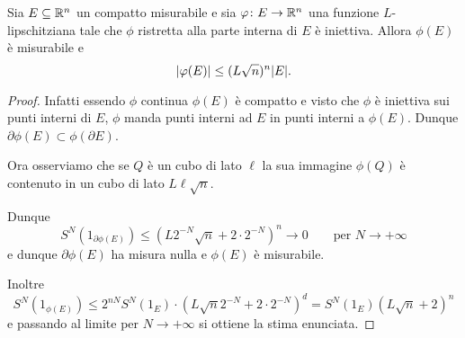 \begin{lemma}
Sia $E\subseteq {\mathbb R}^n$ un compatto misurabile e sia 
$\varphi\colon E\to {\mathbb R}^n$ una funzione $L$-lipschitziana
tale che $\phi$ ristretta alla parte interna di $E$ è iniettiva.
Allora $\phi(E)$ è misurabile e 
\[
  {\left|\varphi(E)\right|} \le (L\sqrt n)^n {\left|E\right|}. 
\]
\end{lemma}
\begin{proof}
Infatti essendo $\phi$ continua $\phi(E)$ è compatto e 
visto che $\phi$ è iniettiva sui punti interni di $E$, 
$\phi$ manda punti interni ad $E$ in punti interni a $\phi(E)$.
Dunque $\partial \phi(E) \subset \phi(\partial E)$.

Ora osserviamo che se $Q$ è un cubo di lato $\ell$ la sua immagine $\phi(Q)$ 
è contenuto in un cubo di lato $L \ell \sqrt n$.

Dunque 
\[
 S^N(1_{\partial \phi(E)})\le (L 2^{-N} \sqrt n + 2\cdot 2^{-N})^n
 \to 0 \qquad\text{per $N\to +\infty$}
\]
e dunque $\partial \phi(E)$ ha misura nulla e $\phi(E)$ è misurabile.

Inoltre 
\[
  S^N(1_{\phi(E)}) \le 2^{nN} S^N(1_E) \cdot (L \sqrt n 2^{-N}+2\cdot 2^{-N})^d 
  = S^N(1_E) (L\sqrt n + 2)^n  
\]
e passando al limite per $N\to +\infty$ si ottiene la stima enunciata.
\end{proof}

